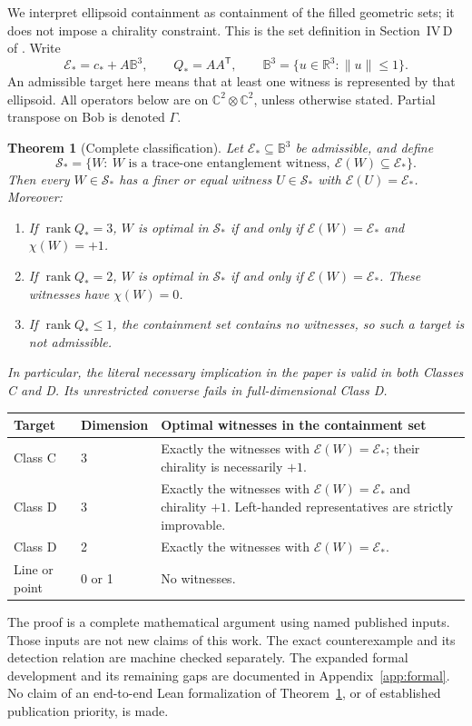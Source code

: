 \documentclass[11pt,a4paper]{article}
\newtheorem{theorem}{Theorem}
\theoremstyle{definition}\newtheorem{definition}[theorem]{Definition}
\newcommand{\rank}{\operatorname{rank}}
\newcommand{\B}{\mathbb B^3}
\newcommand{\E}{\mathcal E}
\newcommand{\C}{\mathbb C}
\newcommand{\R}{\mathbb R}
\newcommand{\cstar}{c_*}
\newcommand{\Qstar}{Q_*}
\newcommand{\Sstar}{\mathcal S_*}
\theoremstyle{plain}\newtheorem*{theorem*}{Theorem}
\begin{document}
We interpret ellipsoid containment as containment of the filled geometric sets; it does not impose a chirality constraint. This is the set definition in Section~IV\,D of \cite{milne}. Write
\[
 \E_*=\cstar+A\B,\qquad \Qstar=AA^{\mathsf T},\qquad \B=\{u\in\R^3:\|u\|\leq1\}.
\]
An admissible target here means that at least one witness is represented by that ellipsoid. All operators below are on $\C^2\otimes\C^2$, unless otherwise stated. Partial transpose on Bob is denoted $\Gamma$.

\begin{theorem}[Complete classification]\label{thm:main}
Let $\E_*\subseteq\B$ be admissible, and define
\[
 \Sstar=\{W:\ W\text{ is a trace-one entanglement witness},\ \E(W)\subseteq\E_*\}.
\]
Then every $W\in\Sstar$ has a finer or equal witness $U\in\Sstar$ with $\E(U)=\E_*$. Moreover:
\begin{enumerate}[label=(\roman*)]
\item If $\rank\Qstar=3$, $W$ is optimal in $\Sstar$ if and only if $\E(W)=\E_*$ and $\chi(W)=+1$.
\item If $\rank\Qstar=2$, $W$ is optimal in $\Sstar$ if and only if $\E(W)=\E_*$. These witnesses have $\chi(W)=0$.
\item If $\rank\Qstar\leq1$, the containment set contains no witnesses, so such a target is not admissible.
\end{enumerate}
In particular, the literal necessary implication in the paper is valid in both Classes C and D. Its unrestricted converse fails in full-dimensional Class D.
\end{theorem}

\begin{center}
\begin{tabularx}{\linewidth}{@{}l l X@{}}
\toprule
Target & Dimension & Optimal witnesses in the containment set\\
\midrule
Class C & 3 & Exactly the witnesses with $\E(W)=\E_*$; their chirality is necessarily $+1$.\\
Class D & 3 & Exactly the witnesses with $\E(W)=\E_*$ and chirality $+1$. Left-handed representatives are strictly improvable.\\
Class D & 2 & Exactly the witnesses with $\E(W)=\E_*$.\\
Line or point & 0 or 1 & No witnesses.\\
\bottomrule
\end{tabularx}
\end{center}

The proof is a complete mathematical argument using named published inputs. Those inputs are not new claims of this work. The exact counterexample and its detection relation are machine checked separately. The expanded formal development and its remaining gaps are documented in Appendix~\ref{app:formal}. No claim of an end-to-end Lean formalization of Theorem~\ref{thm:main}, or of established publication priority, is made.
\end{document}
